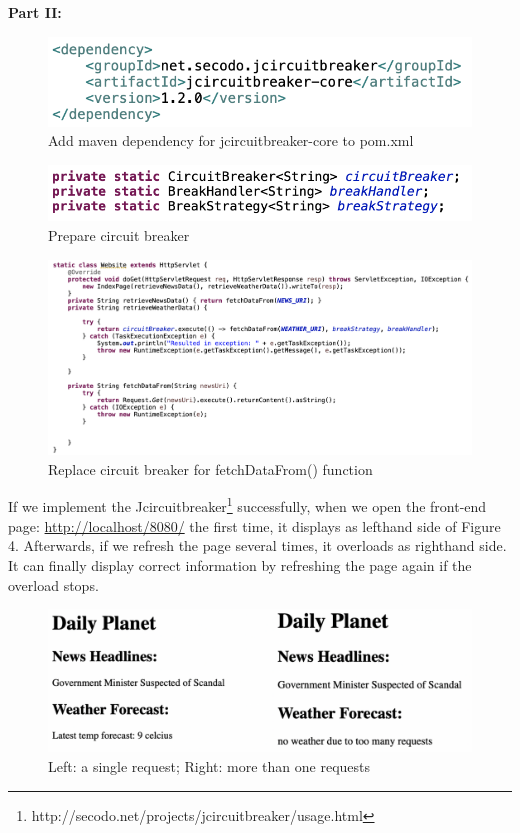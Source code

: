 \documentclass[12pt]{article}
\begin{document}
{\bf Part II: }
\pagestyle{empty}

\begin{figure}[H]
  \centering
	\includegraphics[width=0.6\linewidth]{code2.png}
	\caption{Add maven dependency for jcircuitbreaker-core to pom.xml}
\end{figure}

\begin{figure}[H]
  \centering
	\includegraphics[width=0.6\linewidth]{code1.png}
	\caption{Prepare circuit breaker}
\end{figure}

\begin{figure}[H]
  \centering
	\includegraphics[width=0.8\linewidth]{code4.png}
	\caption{Replace circuit breaker for fetchDataFrom() function}
\end{figure}
If we implement the Jcircuitbreaker\footnote{http://secodo.net/projects/jcircuitbreaker/usage.html} successfully, when we open the 
front-end page: \url{http://localhost/8080/} the first time, it 
displays as lefthand side of Figure 4. Afterwards, if we refresh the page 
several times, it overloads as righthand side. It can finally display correct 
information by refreshing the page again if the overload stops. \\

\begin{figure}[H]
  \centering
	\includegraphics[width=0.8\linewidth]{output.png}
	\caption{Left: a single request; Right: more than one requests}
\end{figure}
\end{document}
